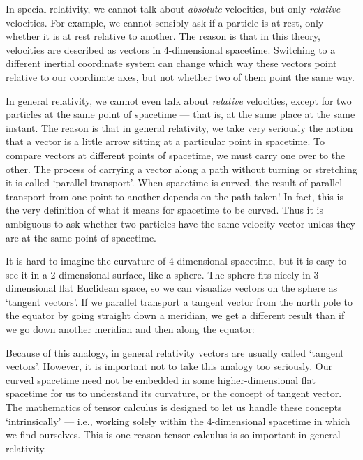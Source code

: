 In special relativity, we cannot talk about {\it absolute} velocities,
but only {\it relative} velocities.  For example, we cannot sensibly ask
if a particle is at rest, only whether it is at rest relative to
another.  The reason is that in this theory, velocities are described as
vectors in 4-dimensional spacetime.  Switching to a different inertial
coordinate system can change which way these vectors point
relative to our coordinate axes, but not
whether two of them point the same way.

In general relativity, we cannot even talk about {\it relative}
velocities, except for two particles at the same point of spacetime ---
that is, at the same place at the same instant.  The reason is that in
general relativity, we take very seriously the notion that a vector is a
little arrow sitting at a particular point in spacetime.  To compare
vectors at different points of spacetime, we must carry one over to the
other.  The process of carrying a vector along a path without turning or
stretching it is called `parallel transport'.  When spacetime is
curved, the result of parallel transport from one point to another
depends on the path taken!  In fact, this is the very definition of what
it means for spacetime to be curved.  Thus it is ambiguous to ask whether
two particles have the same velocity vector unless they are at the same
point of spacetime.

It is hard to imagine the curvature of 4-dimensional spacetime, but
it is easy to see it in a 2-dimensional surface, like a sphere.  The
sphere fits nicely in 3-dimensional flat Euclidean space, so
we can visualize vectors on the sphere as `tangent vectors'.
If we parallel transport a tangent vector from the north pole to the
equator by going straight down a meridian, we get a different result
than if we go down another meridian and then along the equator:

\medskip
\centerline{\epsfysize=2.0in} \medskip

\noindent
Because of this analogy, in general relativity vectors are usually called
`tangent vectors'.  However, it is important not to take this 
analogy too seriously.  Our curved spacetime need not be embedded in some
higher-dimensional flat spacetime for us to understand its curvature, or
the concept of tangent vector.  The mathematics of tensor calculus is
designed to let us handle these concepts `intrinsically' --- i.e.,
working solely within the 4-dimensional spacetime in which we find
ourselves.   This is one reason tensor calculus is so important
in general relativity.

